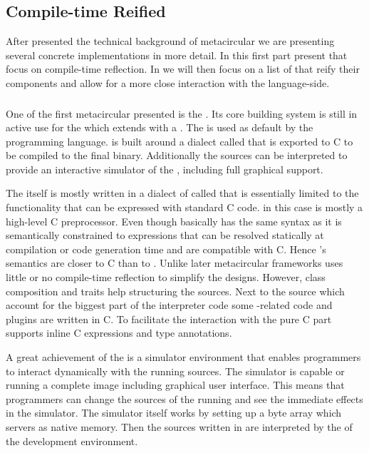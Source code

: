 \subsection{Compile-time Reified \VMs}
After presented the technical background of metacircular \VMs we are presenting several concrete implementations in more detail.
In this first part present \VMs that focus on compile-time reflection.
In  we will then focus on a list of \VMs that reify their components and allow for a more close interaction with the language-side.


\subsubsection*{\Squeak \ST \VM}

One of the first metacircular \VMs presented is the \Squeak \VM\cite{Inga97a}.
Its core building system is still in active use for the  which extends \Squeak with a \JIT.
The \Cog \VM is used as default by the  programming language.
\Squeak is built around a \ST dialect called \Slang that is exported to C to be compiled to the final \VM binary.
Additionally the \Slang sources can be interpreted to provide an interactive simulator of the \VM, including full graphical support.

The \VM itself is mostly written in a dialect of \ST called \Slang that is essentially limited to the functionality that can be expressed with standard C code.
\Slang in this case is mostly a high-level C preprocessor.
Even though \Slang basically has the same syntax as \ST it is semantically constrained to expressions that can be resolved statically at compilation or code generation time and are compatible with C.
Hence \Slang's semantics are closer to C than to \ST.
Unlike later metacircular frameworks \Squeak uses little or no compile-time reflection to simplify the \VM designs.
However, class composition and traits help structuring the sources.
Next to the \Slang source which account for the biggest part of the interpreter code some \OS-related code and plugins are written in C.
To facilitate the interaction with the pure C part \Slang supports inline C expressions and type annotations.

A great achievement of the \Squeak \VM is a simulator environment that enables programmers to interact dynamically with the running \VM sources.
The simulator is capable or running a complete \Squeak \ST image including graphical user interface.
This means that programmers can change the sources of the running \VM and see the immediate effects in the simulator.
The simulator itself works by setting up a byte array which servers as native memory.
Then the \VM sources written in \Slang are interpreted by the \VM of the development environment.

